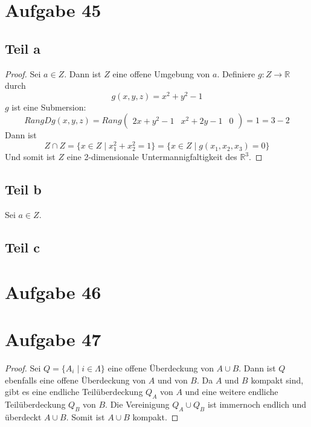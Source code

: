 \documentclass[10pt,a4paper]{article}
\begin{document}
\section{Aufgabe 45}

\subsection{Teil a}

\begin{proof}
  Sei $a \in Z$.
  Dann ist $Z$ eine offene Umgebung von $a$.
  Definiere $g : Z \rightarrow \mathbb{R}$ durch
  \begin{equation}
    g(x, y, z) = x^{2} + y^{2} - 1
  \end{equation}
  $g$ ist eine Submersion:
  \begin{equation}
    Rang Dg(x, y, z) = Rang \begin{pmatrix}
      2x + y^{2} - 1 & x^{2} + 2y - 1 & 0
    \end{pmatrix} = 1 = 3 - 2
  \end{equation}
  Dann ist
  \begin{equation}
    Z \cap Z = \{ x \in Z \mid x_{1}^{2} + x_{2}^{2} = 1 \} = \{ x \in Z \mid g(x_{1}, x_{2}, x_{3}) = 0 \}
  \end{equation}
  Und somit ist $Z$ eine 2-dimensionale Untermannigfaltigkeit des $\mathbb{R}^{3}$.
\end{proof}

\subsection{Teil b}

Sei $a \in Z$.


\subsection{Teil c}

\section{Aufgabe 46}

\section{Aufgabe 47}

\begin{proof}
  Sei $Q = \{ A_{i} \mid i \in \Lambda \}$ eine offene Überdeckung von $A \cup B$.
  Dann ist $Q$ ebenfalls eine offene Überdeckung von $A$ und von $B$.
  Da $A$ und $B$ kompakt sind, gibt es eine endliche Teilüberdeckung $Q_{A}$ von $A$ und eine weitere endliche Teilüberdeckung $Q_{B}$ von $B$.
  Die Vereinigung $Q_{A} \cup Q_{B}$ ist immernoch endlich und überdeckt $A \cup B$.
  Somit ist $A \cup B$ kompakt.
\end{proof}
\end{document}
